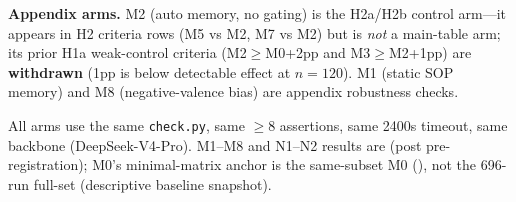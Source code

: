 \textbf{Appendix arms.} M2 (auto memory, no gating) is the H2a/H2b control arm---it appears in H2 criteria rows (M5 vs M2, M7 vs M2) but is \emph{not} a main-table arm; its prior H1a weak-control criteria (M2$\geq$M0+2pp and M3$\geq$M2+1pp) are \textbf{withdrawn} (1pp is below detectable effect at $n{=}120$). M1 (static SOP memory) and M8 (negative-valence bias) are appendix robustness checks.

All arms use the same \texttt{check.py}, same $\geq$8 assertions, same 2400s timeout, same backbone (DeepSeek-V4-Pro). M1--M8 and N1--N2 results are \TBD (post pre-registration); M0's minimal-matrix anchor is the same-subset M0 (\TBD), not the 696-run full-set \MzeroPass{} (descriptive baseline snapshot).

